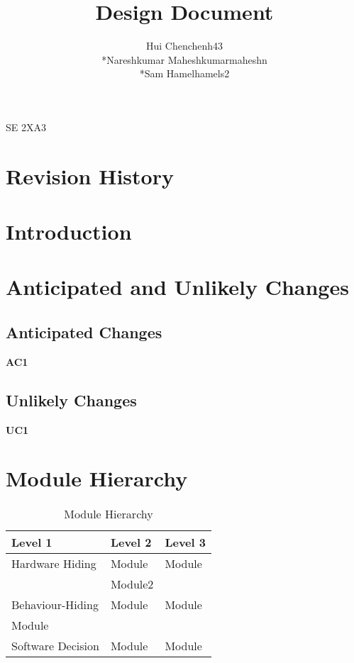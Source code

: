 \documentclass[11pt]{article}
\newcommand{\head}[1]{\textnormal{\textbf{#1}}}
\begin{document}
    \begin{titlepage}
    \title {Design Document}
    \maketitle
        \begin{center}
		SE 2XA3\\
		\author{
		Hui Chen\hspace{128pt}chenh43	
		\\*Nareshkumar Maheshkumar\hspace{35pt}maheshn 
		\\*Sam Hamel\hspace{118pt}hamels2 \\
		}
		\end{center}
    \end{titlepage}
    
    \newpage
    
    \tableofcontents
    \listoftables
    
    \newpage
    \section{Revision History}
    \section{Introduction}
    \section{Anticipated and Unlikely Changes}
    \subsection{Anticipated Changes}
    \textbf{AC1}
     
    \subsection{Unlikely Changes}
    \textbf{UC1}
    
    \section{Module Hierarchy}
    \begin{table}[h]
    \caption{Module Hierarchy}
    \begin{tabular}{p{4cm}p{4cm}p{4cm}}
    \head{Level 1} & \head{Level 2} & \head{Level 3}\\
    \hline
    Hardware Hiding & Module & Module\\
     & Module2 & \\ 
    \hline
    Behaviour-Hiding  & Module & Module\\
    Module & & \\
    \hline
    Software Decision & Module & Module\\
    \hline
    \end{tabular}
    \end{table}
    
\end{document}
